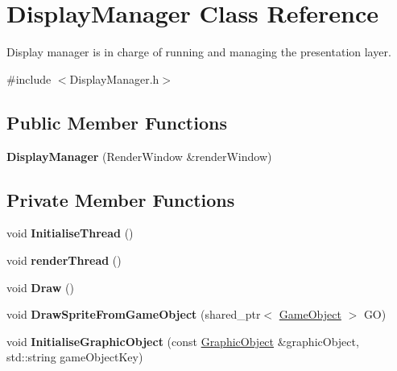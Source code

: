 \hypertarget{class_display_manager}{}\section{Display\+Manager Class Reference}
\label{class_display_manager}


Display manager is in charge of running and managing the presentation layer.  




{\ttfamily \#include $<$Display\+Manager.\+h$>$}

\subsection*{Public Member Functions}
\begin{DoxyCompactItemize}
\item 
\mbox{\label{class_display_manager_a5cae0a0f81cbd2457eca8d35733a0516}} 
{\bfseries Display\+Manager} (Render\+Window \&render\+Window)
\end{DoxyCompactItemize}
\subsection*{Private Member Functions}
\begin{DoxyCompactItemize}
\item 
\mbox{\label{class_display_manager_ab1c3eaf2694410423b6b1eca6a58436f}} 
void {\bfseries Initialise\+Thread} ()
\item 
\mbox{\label{class_display_manager_a79b7a390f3a2a09e7209d271e589e705}} 
void {\bfseries render\+Thread} ()
\item 
\mbox{\label{class_display_manager_a59cef8980a225ca13757e362a92891d1}} 
void {\bfseries Draw} ()
\item 
\mbox{\label{class_display_manager_a6b30869e448609cffa5d3b04d853e1d2}} 
void {\bfseries Draw\+Sprite\+From\+Game\+Object} (shared\+\_\+ptr$<$ \hyperlink{class_game_object}{Game\+Object} $>$ GO)
\item 
\mbox{\label{class_display_manager_a86e3d09636fef2169a593f9a7dc4d20e}} 
void {\bfseries Initialise\+Graphic\+Object} (const \hyperlink{class_graphic_object}{Graphic\+Object} \&graphic\+Object, std\+::string game\+Object\+Key)
\end{DoxyCompactItemize}
